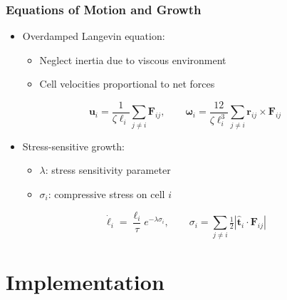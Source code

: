 \documentclass[
	10pt,
	t
]{beamer}
\begin{document}
\begin{frame}
    \frametitle{Equations of Motion and Growth}

    \begin{itemize}
        \item Overdamped Langevin equation:
              \begin{itemize}
                  \item Neglect inertia due to viscous environment
                  \item Cell velocities proportional to net forces
              \end{itemize}
    \end{itemize}

    \vspace{0.2cm}

    \begin{equation*}
        \mathbf{u}_i = \frac{1}{\zeta \ell_i} \sum_{j \neq i} \mathbf{F}_{ij}, \qquad
        \boldsymbol{\omega}_i = \frac{12}{\zeta \ell_i^3} \sum_{j \neq i} \mathbf{r}_{ij} \times \mathbf{F}_{ij}
    \end{equation*}

    \begin{itemize}
        \item Stress-sensitive growth:
              \begin{itemize}
                  \item $\lambda$: stress sensitivity parameter
                  \item $\sigma_i$: compressive stress on cell $i$
              \end{itemize}
    \end{itemize}

    \vspace{0.2cm}

    \begin{equation*}
        \dot{\ell}_i = \frac{\ell_i}{\tau} e^{-\lambda \sigma_i},  \qquad  \sigma_i = \sum_{j \neq i} \tfrac{1}{2} \left| \hat{\mathbf{t}}_i \cdot \mathbf{F}_{ij} \right|
    \end{equation*}

\end{frame}

\section{Implementation}
\end{document}
